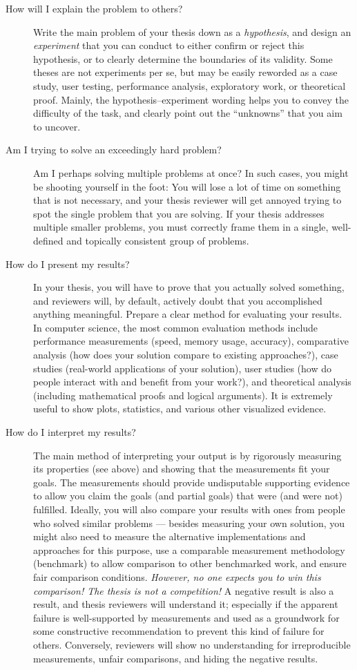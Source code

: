\begin{description}
\item[How will I explain the problem to others?]
Write the main problem of your thesis down as a \emph{hypothesis}, and design an \emph{experiment} that you can conduct to either confirm or reject this hypothesis, or to clearly determine the boundaries of its validity. Some theses are not experiments per se, but may be easily reworded as a case study, user testing, performance analysis, exploratory work, or theoretical proof. Mainly, the hypothesis--experiment wording helps you to convey the difficulty of the task, and clearly point out the ``unknowns'' that you aim to uncover.
\item[Am I trying to solve an exceedingly hard problem?]
Am I perhaps solving multiple problems at once? In such cases, you might be shooting yourself in the foot: You will lose a lot of time on something that is not necessary, and your thesis reviewer will get annoyed trying to spot the single problem that you are solving. If your thesis addresses multiple smaller problems, you must correctly frame them in a single, well-defined and topically consistent group of problems.
\item[How do I present my results?]
In your thesis, you will have to prove that you actually solved something, and reviewers will, by default, actively doubt that you accomplished anything meaningful. Prepare a clear method for evaluating your results. In computer science, the most common evaluation methods include performance measurements (speed, memory usage, accuracy), comparative analysis (how does your solution compare to existing approaches?), case studies (real-world applications of your solution), user studies (how do people interact with and benefit from your work?), and theoretical analysis (including mathematical proofs and logical arguments). It is extremely useful to show plots, statistics, and various other visualized evidence.
\item[How do I interpret my results?]
The main method of interpreting your output is by rigorously measuring its properties (see above) and showing that the measurements fit your goals. The measurements should provide undisputable supporting evidence to allow you claim the goals (and partial goals) that were (and were not) fulfilled. Ideally, you will also compare your results with ones from people who solved similar problems --- besides measuring your own solution, you might also need to measure the alternative implementations and approaches for this purpose, use a comparable measurement methodology (benchmark) to allow comparison to other benchmarked work, and ensure fair comparison conditions. \emph{However, no one expects you to win this comparison! The thesis is not a competition!} A negative result is also a result, and thesis reviewers will understand it; especially if the apparent failure is well-supported by measurements and used as a groundwork for some constructive recommendation to prevent this kind of failure for others. Conversely, reviewers will show no understanding for irreproducible measurements, unfair comparisons, and hiding the negative results.

\end{description}
